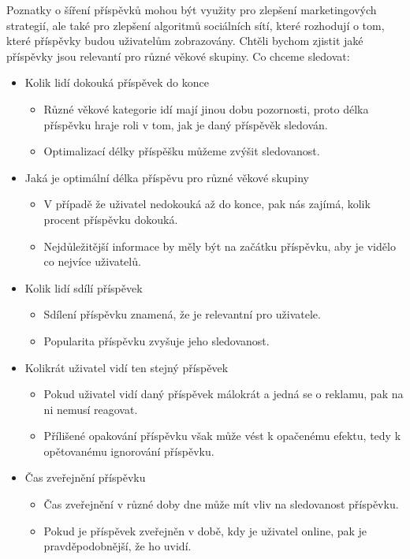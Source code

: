 \documentclass[11pt, a4paper]{article}
\begin{document}
Poznatky o šíření příspěvků mohou být využity pro zlepšení marketingových strategií,
ale také pro zlepšení algoritmů sociálních sítí, které rozhodují o tom, které příspěvky budou uživatelům zobrazovány.
Chtěli bychom zjistit jaké příspěvky jsou relevantí pro různé věkové skupiny.
Co chceme sledovat:
\begin{itemize}
    \item Kolik lidí dokouká příspěvek do konce
    \begin{itemize}
        \item Různé věkové kategorie idí mají jinou dobu pozornosti, proto délka příspěvku hraje roli v tom, jak je daný příspěvěk sledován.
        \item Optimalizací délky příspěšku můžeme zvýšit sledovanost.
    \end{itemize}
    \item Jaká je optimální délka příspěvu pro různé věkové skupiny
    \begin{itemize}
        \item V případě že uživatel nedokouká až do konce, pak nás zajímá, kolik procent příspěvku dokouká.
        \item Nejdůležitější informace by měly být na začátku příspěvku, aby je vidělo co nejvíce uživatelů.
    \end{itemize}
    \item Kolik lidí sdílí příspěvek
    \begin{itemize}
        \item Sdílení příspěvku znamená, že je relevantní pro uživatele.
        \item Popularita příspěvku zvyšuje jeho sledovanost.
    \end{itemize}
    \item Kolikrát uživatel vidí ten stejný příspěvek
    \begin{itemize}
        \item Pokud uživatel vidí daný příspěvek málokrát a jedná se o reklamu, pak na ni nemusí reagovat.
        \item Přílišené opakování příspěvku však může vést k opačenému efektu, tedy k opětovanému ignorování příspěvku.
    \end{itemize}
    \item Čas zveřejnění příspěvku 
    \begin{itemize}
        \item Čas zveřejnění v různé doby dne může mít vliv na sledovanost příspěvku.
        \item Pokud je příspěvek zveřejněn v době, kdy je uživatel online, pak je pravděpodobnější, že ho uvidí.
    \end{itemize}
\end{itemize}
\end{document}
